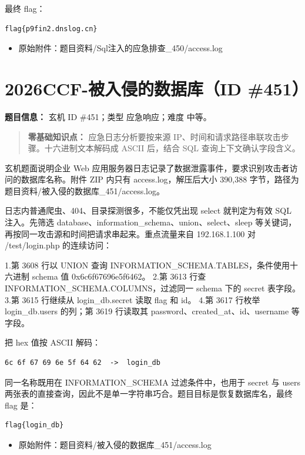 最终 flag：

\begin{verbatim}
flag{p9fin2.dnslog.cn}
\end{verbatim}

\begin{itemize}
\tightlist
\item
  原始附件：题目资料/Sql注入的应急排查\_450/access.log
\end{itemize}

\section{2026CCF-被入侵的数据库（ID \#451）}\label{ccf-ux88abux5165ux4fb5ux7684ux6570ux636eux5e93id-451}

\textbf{题目信息：} 玄机 ID \#451；类型 应急响应；难度 中等。

\begin{quote}
\textbf{零基础知识点：} 应急日志分析要按来源 IP、时间和请求路径串联攻击步骤。十六进制文本解码成 ASCII 后，结合 SQL 查询上下文确认字段含义。
\end{quote}

玄机题面说明企业 Web 应用服务器日志记录了数据泄露事件，要求识别攻击者访问的数据库名称。附件 ZIP 内只有 access.log，解压后大小 390,388 字节，路径为题目资料/被入侵的数据库\_451/access.log。

日志内普通爬虫、404、目录探测很多，不能仅凭出现 select 就判定为有效 SQL 注入。先筛选 database、information\_schema、union、select、sleep 等关键词，再按同一攻击源和时间把请求串起来。重点流量来自 192.168.1.100 对 /test/login.php 的连续访问：

1.第 3608 行以 UNION 查询 INFORMATION\_SCHEMA.TABLES，条件使用十六进制 schema 值 0x6c6f67696e5f6462。 2.第 3613 行查 INFORMATION\_SCHEMA.COLUMNS，过滤同一 schema 下的 secret 表字段。 3.第 3615 行继续从 login\_db.secret 读取 flag 和 id。 4.第 3617 行枚举 login\_db.users 的列；第 3619 行读取其 password、created\_at、id、username 等字段。

把 hex 值按 ASCII 解码：

\begin{verbatim}
6c 6f 67 69 6e 5f 64 62  ->  login_db
\end{verbatim}

同一名称既用在 INFORMATION\_SCHEMA 过滤条件中，也用于 secret 与 users 两张表的直接查询，因此不是单一字符串巧合。题目目标是恢复数据库名，最终 flag 是：

\begin{verbatim}
flag{login_db}
\end{verbatim}

\begin{itemize}
\tightlist
\item
  原始附件：题目资料/被入侵的数据库\_451/access.log
\end{itemize}
